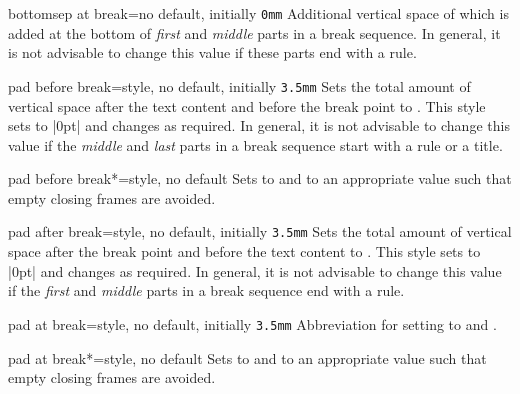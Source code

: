 \begin{docTcbKey}{bottomsep at break}{=}{no default, initially \texttt{0mm}}
  Additional vertical space of  which is added at the bottom of
  \emph{first} and \emph{middle} parts in a break sequence.
  In general, it is not advisable to change this value if these parts end with a rule.
\end{docTcbKey}

\begin{docTcbKey}{pad before break}{=}{style, no default, initially \texttt{3.5mm}}
  Sets the total amount of vertical space after the text content and before the
  break point to . This style sets  to |0pt|
  and changes  as required.
  In general, it is not advisable to change this value if the
  \emph{middle} and \emph{last} parts in a break sequence start with a rule or a title.
\end{docTcbKey}

\begin{docTcbKey}{pad before break*}{=}{style, no default}
  Sets  to  and
   to an appropriate value such that
  empty closing frames are avoided.
\end{docTcbKey}

\begin{docTcbKey}{pad after break}{=}{style, no default, initially \texttt{3.5mm}}
  Sets the total amount of vertical space after the break point and before the
  text content to . This style sets  to |0pt|
  and changes  as required.
  In general, it is not advisable to change this value if the
  \emph{first} and \emph{middle} parts in a break sequence end with a rule.
\end{docTcbKey}

\begin{docTcbKey}{pad at break}{=}{style, no default, initially \texttt{3.5mm}}
  Abbreviation for setting  to 
  and .
\end{docTcbKey}

\enlargethispage*{5mm}

\begin{docTcbKey}{pad at break*}{=}{style, no default}
  Sets  to  and
   to an appropriate value such that
  empty closing frames are avoided.
\end{docTcbKey}

